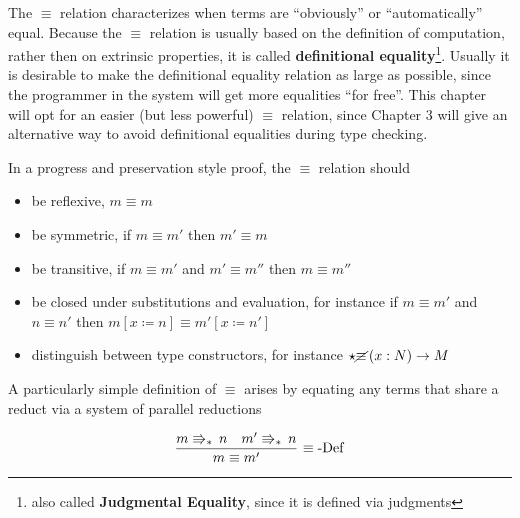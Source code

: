 The $\equiv$ relation characterizes when terms are ``obviously'' or ``automatically'' equal.
Because the $\equiv$ relation is usually based on the definition of computation, rather then on extrinsic properties, it is called \textbf{definitional equality}\footnote{also called \textbf{Judgmental Equality}, since it is defined via judgments}.
Usually it is desirable to make the definitional equality relation as large as possible, since the programmer in the system will get more equalities ``for free''.
This chapter will opt for an easier (but less powerful) $\equiv$ relation, since Chapter 3 will give an alternative way to avoid definitional equalities during type checking.

In a progress and preservation style proof, the $\equiv$ relation should 

\begin{itemize}
\item be reflexive, $m\equiv m$ 
\item be symmetric, if $m\equiv m'$ then $m'\equiv m$ 
\item be transitive, if $m\equiv m'$ and $m'\equiv m''$ then $m\equiv m''$ 
\item be closed under substitutions and evaluation, for instance if $m\equiv m'$ and $n\equiv n'$ then $m\left[x\coloneqq n\right]\equiv m'\left[x\coloneqq n'\right]$ 
\item distinguish between type constructors, for instance $\star\cancel{\equiv}\left(x:N\right)\rightarrow M$ 
\end{itemize}
A particularly simple definition of $\equiv$ arises by equating any terms that share a reduct via a system of parallel reductions

\[
\frac{m\Rrightarrow_{\ast}\,n\quad m'\Rrightarrow_{\ast}\,n}{m\equiv m'}\,\operatorname{\equiv-Def}
\]

